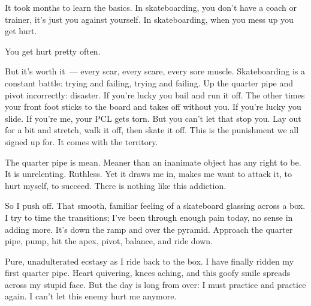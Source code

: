 It took months to learn the basics. In skateboarding, you don't have a coach or trainer, it's just you against yourself. In skateboarding, when you mess up you get hurt.

You get hurt pretty often.

But it's worth it~--- every scar, every scare, every sore muscle. Skateboarding is a constant battle: trying and failing, trying and failing. Up the quarter pipe and pivot incorrectly: disaster. If you're lucky you bail and run it off. The other times your front foot sticks to the board and takes off without you. If you're lucky you slide. If you're me, your PCL gets torn. But you can't let that stop you. Lay out for a bit and stretch, walk it off, then skate it off. This is the punishment we all signed up for. It comes with the territory.

The quarter pipe is mean. Meaner than an inanimate object has any right to be. It is unrelenting. Ruthless. Yet it draws me in, makes me want to attack it, to hurt myself, to succeed. There is nothing like this addiction.

So I push off. That smooth, familiar feeling of a skateboard glassing across a box. I try to time the transitions; I've been through enough pain today, no sense in adding more. It's down the ramp and over the pyramid. Approach the quarter pipe, pump, hit the apex, pivot, balance, and ride down.

Pure, unadulterated ecstasy as I ride back to the box. I have finally ridden my first quarter pipe. Heart quivering, knees aching, and this goofy smile spreads across my stupid face. But the day is long from over: I must practice and practice again. I can't let this enemy hurt me anymore.
